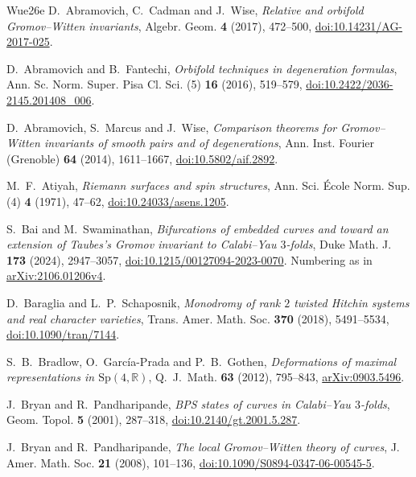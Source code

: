 \begin{thebibliography}{Wue26e}
 D.~Abramovich, C.~Cadman and J.~Wise, \emph{Relative and orbifold Gromov--Witten invariants}, Algebr. Geom. \textbf{4} (2017), 472--500, \href{https://doi.org/10.14231/AG-2017-025}{doi:10.14231/AG-2017-025}.

 D.~Abramovich and B.~Fantechi, \emph{Orbifold techniques in degeneration formulas}, Ann. Sc. Norm. Super. Pisa Cl. Sci. (5) \textbf{16} (2016), 519--579, \href{https://doi.org/10.2422/2036-2145.201408_006}{doi:10.2422/2036-2145.201408\_006}.

 D.~Abramovich, S.~Marcus and J.~Wise, \emph{Comparison theorems for Gromov--Witten invariants of smooth pairs and of degenerations}, Ann. Inst. Fourier (Grenoble) \textbf{64} (2014), 1611--1667, \href{https://doi.org/10.5802/aif.2892}{doi:10.5802/aif.2892}.

 M.~F.~Atiyah,
\emph{Riemann surfaces and spin structures}, Ann. Sci. \'Ecole Norm. Sup. (4)
\textbf{4} (1971), 47--62, \href{https://doi.org/10.24033/asens.1205}{doi:10.24033/asens.1205}.

 S.~Bai and M.~Swaminathan,
\emph{Bifurcations of embedded curves and toward an extension of Taubes's
Gromov invariant to Calabi--Yau $3$-folds}, Duke Math. J. \textbf{173}
(2024), 2947--3057,
\href{https://doi.org/10.1215/00127094-2023-0070}{doi:10.1215/00127094-2023-0070}.
Numbering as in \href{https://arxiv.org/abs/2106.01206v4}{arXiv:2106.01206v4}.

 D.~Baraglia and L.~P.~Schaposnik,
\emph{Monodromy of rank $2$ twisted Hitchin systems and real character varieties},
Trans. Amer. Math. Soc. \textbf{370} (2018), 5491--5534,
\href{https://doi.org/10.1090/tran/7144}{doi:10.1090/tran/7144}.

 S.~B.~Bradlow, O.~Garc\'ia-Prada and P.~B.~Gothen, \emph{Deformations of maximal representations in $\mathrm{Sp}(4,\mathbb R)$}, Q.~J.~Math. \textbf{63} (2012), 795--843, \href{https://arxiv.org/abs/0903.5496}{arXiv:0903.5496}.

 J.~Bryan and R.~Pandharipande,
\emph{BPS states of curves in Calabi--Yau $3$-folds},
Geom. Topol. \textbf{5} (2001), 287--318,
\href{https://doi.org/10.2140/gt.2001.5.287}{doi:10.2140/gt.2001.5.287}.

 J.~Bryan and R.~Pandharipande,
\emph{The local Gromov--Witten theory of curves}, J. Amer. Math. Soc.
\textbf{21} (2008), 101--136,
\href{https://doi.org/10.1090/S0894-0347-06-00545-5}{doi:10.1090/S0894-0347-06-00545-5}.


\end{thebibliography}
